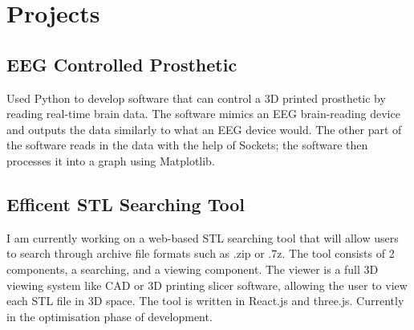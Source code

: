 \documentclass{article}
\begin{document}
\noindent
\begin{minipage}[t]{1\textwidth}
    \section{Projects}
    \subsection{EEG Controlled Prosthetic}
    \vspace{-0.5em} %
    \normalsize{Used Python to develop software that can control a 3D printed
    prosthetic by reading real-time brain data. The software mimics
    an EEG brain-reading device and outputs the data similarly to
    what an EEG device would. The other part of the software reads
    in the data with the help of Sockets; the software then processes
    it into a graph using Matplotlib.}
    \vspace{0.5em} %
\begin{comment}
    \subsection{Efficient Sudoku Solver}
    \vspace{-0.5em} %
    \normalsize{Used C++ to implement an algorithm to solve given Sudoku puzzles as efficiently as possible using the hidden single and naked
    single algorithm with the help of pointers to make it more efficient.}
    \vspace{0.5em} %
\end{comment}

    \subsection{Efficent STL Searching Tool}
    \vspace{-0.5em} %
    \normalsize{I am currently working on a web-based STL searching tool that will allow users to search through archive file formats such as .zip or .7z. The tool consists of 2 components, a searching, and a viewing component. The viewer is a full 3D viewing system like CAD or 3D printing slicer software, allowing the user to view each STL file in 3D space. The tool is written in React.js and three.js. Currently in the optimisation phase of development.}
    \vspace{0.5em} %
\end{minipage}
\end{document}
